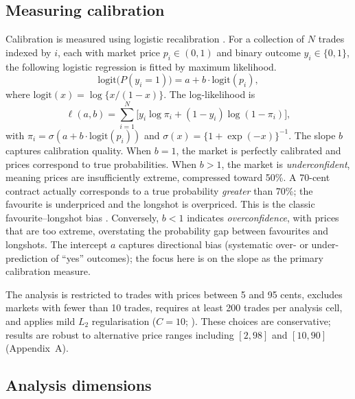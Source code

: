 \documentclass[numsec,webpdf,modern,medium]{oup-authoring-template}
\theoremstyle{thmstyleone}%
\theoremstyle{thmstyletwo}%
\theoremstyle{thmstylethree}%
\begin{document}
\subsection{Measuring calibration}\label{sec:measuring}

Calibration is measured using logistic recalibration \citep{platt1999probabilistic,niculescumizil2005predicting}. For a collection of $N$ trades indexed by $i$, each with market price $p_i \in (0,1)$ and binary outcome $y_i \in \{0,1\}$, the following logistic regression is fitted by maximum likelihood.
\begin{equation}\label{eq:logistic}
\mathrm{logit}\bigl(P(y_i = 1)\bigr) = a + b \cdot \mathrm{logit}(p_i),
\end{equation}
where $\mathrm{logit}(x) = \log\{x/(1-x)\}$. The log-likelihood is
\begin{equation}\label{eq:loglik}
\ell(a, b) = \sum_{i=1}^{N} \bigl[y_i \log \pi_i + (1 - y_i) \log(1 - \pi_i)\bigr],
\end{equation}
with $\pi_i = \sigma(a + b \cdot \mathrm{logit}(p_i))$ and $\sigma(x) = \{1 + \exp(-x)\}^{-1}$.
The slope $b$ captures calibration quality. When $b = 1$, the market is perfectly calibrated and prices correspond to true probabilities. When $b > 1$, the market is \emph{underconfident}, meaning prices are insufficiently extreme, compressed toward 50\%. A 70-cent contract actually corresponds to a true probability \emph{greater} than 70\%; the favourite is underpriced and the longshot is overpriced. This is the classic favourite--longshot bias \citep{griffith1949odds,page2013prediction}. Conversely, $b < 1$ indicates \emph{overconfidence}, with prices that are too extreme, overstating the probability gap between favourites and longshots. The intercept $a$ captures directional bias (systematic over- or under-prediction of ``yes'' outcomes); the focus here is on the slope as the primary calibration measure.

The analysis is restricted to trades with prices between 5 and 95 cents, excludes markets with fewer than 10 trades, requires at least 200 trades per analysis cell, and applies mild $L_2$ regularisation ($C = 10$; \citealp{hosmer2013applied}). These choices are conservative; results are robust to alternative price ranges including $[2, 98]$ and $[10, 90]$ (Appendix~A).
\subsection{Analysis dimensions}\label{sec:dimensions}
\end{document}
